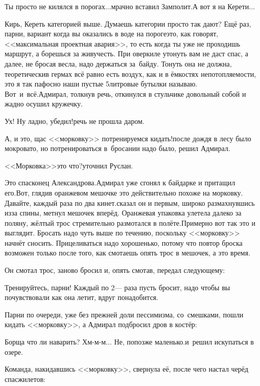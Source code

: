 \diagdash Ты просто не килялся в порогах$\ldots$\mdash мрачно вставил Замполит.\mdash А вот я на Керети$\ldots$

\diagdash Кирь, Кереть категорией выше. Думаешь категории просто так дают? Ещё раз, парни, вариант когда вы оказались в воде на пороге\mdash это, как говорят, <<максимальная проектная авария>>, то есть когда ты уже не проходишь маршрут, а борешься за живучесть. При оверкиле утонуть вам не даст спас, а далее, не бросая весла, надо держаться за~байду. Тонуть она не должна, теоретически\mdash в гермах всё равно есть воздух, как и в ёмкостях непотопляемости, это я так пафосно наши пустые 5\sdash литровые бутылки называю. Вот~и~всё.\mdash Адмирал, толкнув речь, откинулся в стульчике довольный собой и жадно осушил кружечку.

\diagdash Ух! Ну ладно, убедил!\mdash речь не прошла даром.

\diagdash А, и это, щас <<морковку>> потренируемся кидать!\mdash после дождя в лесу было мокровато, но потренироваться в~бросании надо было, решил Адмирал.

\diagdash <<Морковка>>\mdash это что?\mdash уточнил Руслан.

\diagdash Это спасконец Александрова.\mdash Адмирал уже сгонял к байдарке и притащил его.\mdash Вот, гляди\mdash в оранжевом мешочке это действительно похоже на морковку. Давайте, каждый раза по два кинет.\mdash сказал он и первым, широко размахнувшись из\sdash за спины, метнул мешочек вперёд. Оранжевая упаковка улетела далеко за поляну, жёлтый трос стремительно размотался в полёте.\mdash Примерно вот так это и выглядит. Бросать надо чуть выше по течению, поскольку <<морковку>> начнёт сносить. Прицеливаться надо хорошенько, потому что повтор броска возможен только после того, как смотаешь опять трос в мешочек, а это время.

Он смотал трос, заново бросил и, опять смотав, передал следующему:

\diagdash Тренируйтесь, парни! Каждый по 2\thinspace\nobreakdash--- раза пусть бросит, надо чтобы вы почувствовали как она летит, вдруг понадобится.

Парни по очереди, уже без прежней доли пессимизма, со~смешками, пошли кидать <<морковку>>, а Адмирал подбросил дров в костёр:

\diagdash Борща что ли наварить? Хм-м-м$\ldots$ Не, попозже маленько.\mdash и~решил искупаться в озере.

Команда, накидавшись <<морковку>>, свернула её, после чего настал черёд спасжилетов:


